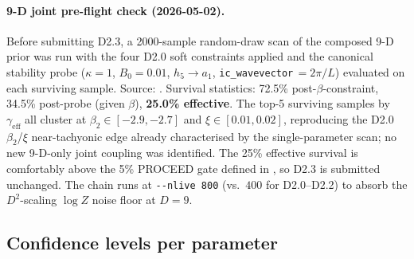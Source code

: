 \paragraph{9-D joint pre-flight check (2026-05-02).}
\label{par:d23-joint-check}
Before submitting D2.3, a 2000-sample random-draw scan of the composed
9-D prior was run with the four D2.0 soft constraints applied and the
canonical stability probe ($\kappa=1$, $B_0=0.01$, $h_5\!\to\!a_1$,
\texttt{ic\_wavevector}\,$=2\pi/L$) evaluated on each surviving sample.
Source: \linebreak
{}.  Survival statistics: 72.5\% post-$\beta$-constraint,
34.5\% post-probe (given $\beta$), \textbf{25.0\% effective}.  The top-5
surviving samples by $\gamma_\mathrm{eff}$ all cluster at $\beta_2 \in
[-2.9, -2.7]$ and $\xi \in [0.01, 0.02]$, reproducing the D2.0
$\beta_2$/$\xi$ near-tachyonic edge already characterised by the
single-parameter scan; no new 9-D-only joint coupling was identified.
The 25\% effective survival is comfortably above the 5\% PROCEED gate
defined in , so D2.3 is submitted unchanged.  The
chain runs at \verb|--nlive 800| (vs.~$400$ for D2.0--D2.2) to absorb
the $D^2$-scaling $\log Z$ noise floor at $D=9$.

\subsection{Confidence levels per parameter}
\label{sec:confidence}

